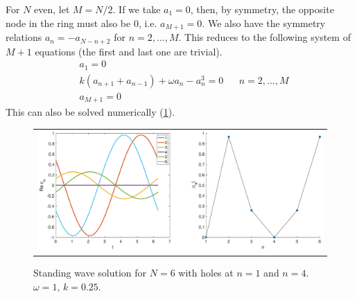 \documentclass[12pt]{article}
\begin{document}
For $N$ even, let $M = N/2$. If we take $a_1 = 0$, then, by symmetry, the opposite node in the ring must also be 0, i.e. $a_{M+1} = 0$. We also have the symmetry relations $a_n = -a_{N-n+2}$ for $n = 2, \dots, M$. This reduces to the following system of $M+1$ equations (the first and last one are trivial).
\begin{equation}\label{eq:twistevenzero}
\begin{aligned}
&a_1 = 0 \\
&k\left( a_{n+1} + a_{n-1} \right) + \omega a_n - a_n^3 = 0 && n = 2, \dots, M \\
&a_{M+1} = 0
\end{aligned}
\end{equation}
This can also be solved numerically (\cref{fig:hole6}).
\begin{figure}[H]
\begin{center}
\begin{tabular}{c}
\includegraphics[width=14cm]{images/twist6hole.eps}
\end{tabular}
\end{center}
\caption{Standing wave solution for $N = 6$ with holes at $n = 1$ and $n=4$. $\omega = 1$, $k = 0.25$.}
\label{fig:hole6}
\end{figure}
\end{document}
